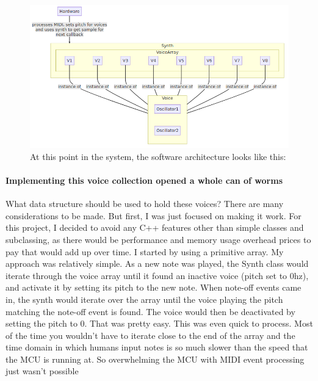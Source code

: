 \documentclass[acmlarge,screen]{acmart}
\begin{document}
	\begin{figure}[H]
		\includegraphics[width=\linewidth]{voice_graph_diagram}
		\caption{At this point in the system, the software architecture looks like this:}
		\centering
	\end{figure}
	
	\paragraph{Implementing this voice collection opened a whole can of worms} What data structure should be used to hold these voices? There are many considerations to be made. But first, I was just focused on making it work. For this project, I decided to avoid any C++ features other than simple classes and subclassing, as there would be performance and memory usage overhead prices to pay that would add up over time. I started by using a primitive array. My approach was relatively simple. As a new note was played, the Synth class would iterate through the voice array until it found an inactive voice (pitch set to 0hz), and activate it by setting its pitch to the new note. When note-off events came in, the synth would iterate over the array until the voice playing the pitch matching the note-off event is found. The voice would then be deactivated by setting the pitch to 0. That was pretty easy. This was even quick to process. Most of the time you wouldn't have to iterate close to the end of the array and the time domain in which humans input notes is so much slower than the speed that the MCU is running at. So overwhelming the MCU with MIDI event processing just wasn't possible
\end{document}
